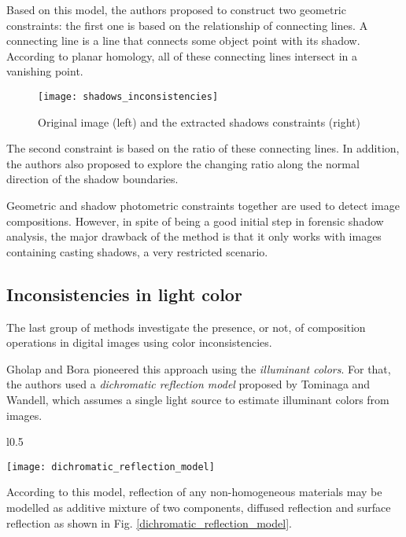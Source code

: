 Based on this model, the authors proposed to construct two geometric constraints: the first one is based on the relationship of connecting lines. A connecting line is a line that connects some object point with its shadow. According to planar homology, all of these connecting lines intersect in a vanishing point. 

\begin{figure}
  \centering
    \texttt{[image: shadows\_inconsistencies]}
    \caption{Original image (left) and the extracted shadows constraints (right)}
    \label{shadows_inconsistencies}
\end{figure}

The second constraint is based on the ratio of these connecting lines. In addition, the authors also proposed to explore the changing ratio along the normal direction of the shadow boundaries. 

Geometric and shadow photometric constraints together are used to detect image compositions. However, in spite of being a good initial step in forensic shadow analysis, the major drawback of the method is that it only works with images containing casting shadows, a very restricted scenario.

\subsection{Inconsistencies in light color}

The last group of methods investigate the presence, or not, of composition operations in digital images using color inconsistencies.

Gholap and Bora\cite{gholap2008illuminant} pioneered this approach using the \emph{illuminant colors}. For that, the authors used a \emph{dichromatic reflection model} proposed by Tominaga and Wandell\cite{tominaga1989standard}, which assumes a single light source to estimate illuminant colors from images.

\begin{wrapfigure}{l}{0.5\textwidth}
  \begin{center}
    \texttt{[image: dichromatic\_reflection\_model]}
  \end{center}
  \label{dichromatic_reflection_model}
  \caption{The dichromatic reflection model}
\end{wrapfigure}


According to this model, reflection of any non-homogeneous materials may be modelled as additive mixture of two components, diffused reflection and surface reflection as shown in Fig. \ref{dichromatic_reflection_model}.

